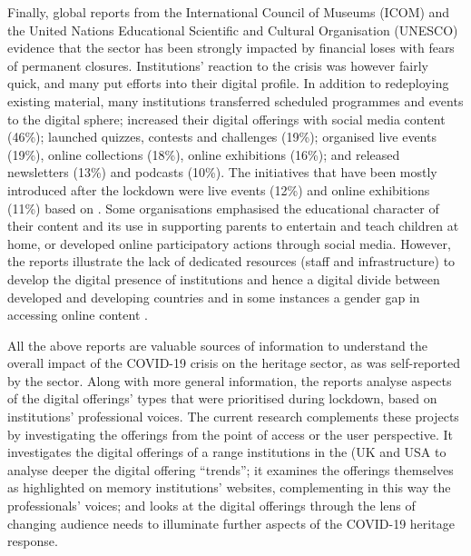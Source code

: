 \documentclass{egpubl}
\begin{document}
Finally, global reports from the International Council of Museums (ICOM) and the United Nations Educational Scientific and Cultural Organisation (UNESCO) evidence that the sector has been strongly impacted by financial loses with fears of permanent closures. Institutions' reaction to the crisis was however fairly quick, and many put efforts into their digital profile. In addition to redeploying existing material, many institutions transferred scheduled programmes and events to the digital sphere; increased their digital offerings with social media content (46\%); launched quizzes, contests and challenges (19\%); organised live events (19\%), online collections (18\%), online exhibitions (16\%); and released newsletters (13\%) and podcasts (10\%). The initiatives that have  been mostly introduced after the lockdown were live events  (12\%) and online exhibitions (11\%)  based on \cite{InternationalCouncilofMuseums2020b}. Some organisations emphasised the educational character of their content and its use in supporting parents to entertain and teach children at home, or developed online participatory actions through social media. However, the reports illustrate the lack of dedicated resources (staff and infrastructure) to develop the digital presence of institutions and hence a digital divide between developed and developing countries and in some instances a gender gap in accessing online content \cite{UNESCO2020,InternationalCouncilofMuseums2020b}.

All the above reports are valuable sources of information to understand the overall impact of the COVID-19 crisis on the heritage sector, as was self-reported by the sector. Along with more general information, the reports analyse aspects of the digital offerings' types that were prioritised during lockdown, based on institutions' professional voices. The current research complements these projects by investigating the offerings from the point of access or the user perspective.  It investigates the digital offerings of a range institutions in the (UK and USA to analyse deeper the digital offering ``trends''; it examines the offerings themselves as highlighted on memory institutions' websites, complementing in this way the professionals' voices; and looks at the digital offerings through the lens of changing audience needs to illuminate further aspects of the COVID-19 heritage response.

\end{document}
